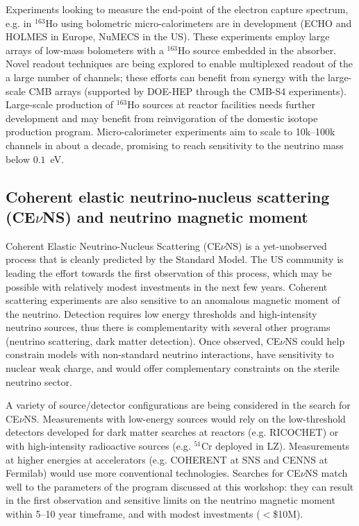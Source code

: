 Experiments looking to measure the end-point of the electron capture
spectrum, e.g. in $^{163}$Ho using bolometric micro-calorimeters are
in development (ECHO and HOLMES in Europe, NuMECS in the US). These
experiments employ large arrays of low-mass bolometers with a
$^{163}$Ho source embedded in the absorber. Novel readout techniques
are being explored to enable multiplexed readout of the a large number
of channels; these efforts can benefit from synergy with the
large-scale CMB arrays (supported by DOE-HEP through the CMB-S4
experiments). Large-scale production of $^{163}$Ho sources at reactor
facilities needs further  development and may benefit from
reinvigoration of the domestic isotope production program. 
Micro-calorimeter experiments aim to scale to 10k--100k
channels in about a decade, promising to reach sensitivity to the
neutrino mass below $0.1$~eV.


\subsection{Coherent elastic neutrino-nucleus scattering (CE$\nu$NS)
  and neutrino magnetic moment}

Coherent Elastic Neutrino-Nucleus Scattering (CE$\nu$NS) is a yet-unobserved
process that is cleanly predicted by the Standard Model.  The US
community is leading the effort towards the first observation of this
process, which may be possible with relatively modest investments in
the next few years. Coherent scattering experiments are also
sensitive to an anomalous magnetic moment of the neutrino. Detection
requires low energy thresholds and high-intensity neutrino sources,
thus there is complementarity with several other programs (neutrino
scattering, dark matter detection). Once observed, CE$\nu$NS could help
constrain models with non-standard neutrino interactions, have
sensitivity to nuclear weak charge, and would offer complementary
constraints on the sterile neutrino sector. 

A variety of source/detector configurations are being considered in the
search for CE$\nu$NS. Measurements with low-energy sources would rely
on the low-threshold detectors developed for dark matter searches at
reactors (e.g. RICOCHET) or with high-intensity radioactive
sources (e.g. $^{51}$Cr deployed in LZ). Measurements at higher
energies at accelerators (e.g. COHERENT at SNS and CENNS at Fermilab)
would use more conventional technologies. Searches for CE$\nu$NS match
well to the parameters of the program discussed at this workshop: they
can result in the first observation and sensitive limits on the
neutrino magnetic moment within 5--10 year timeframe, and with modest
investments ($<$\$10M). 

